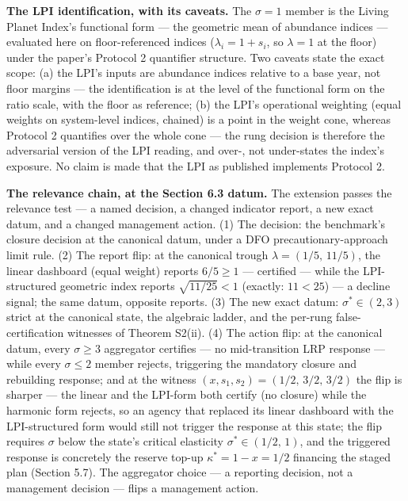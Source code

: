 \documentclass[3p,11pt]{elsarticle}
\begin{document}
\textbf{The LPI identification, with its caveats.} The \(\sigma = 1\)
member is the Living Planet Index's functional form --- the geometric mean
of abundance indices --- evaluated here on floor-referenced indices
(\(\lambda_i = 1 + s_i\), so \(\lambda = 1\) at the floor) under the
paper's Protocol 2 quantifier structure. Two caveats state the exact
scope: (a) the LPI's inputs are abundance indices relative to a base
year, not floor margins --- the identification is at the level of the
functional form on the ratio scale, with the floor as reference; (b) the
LPI's operational weighting (equal weights on system-level indices,
chained) is a point in the weight cone, whereas Protocol 2 quantifies
over the whole cone --- the rung decision is therefore the adversarial
version of the LPI reading, and over-, not under-states the index's
exposure. No claim is made that the LPI as published implements Protocol
2.

\textbf{The relevance chain, at the Section 6.3 datum.} The extension
passes the relevance test --- a named decision, a changed indicator
report, a new exact datum, and a changed management action. (1) The
decision: the benchmark's closure decision at the canonical datum, under
a DFO precautionary-approach limit rule. (2) The report flip: at
the canonical trough \(\lambda = (1/5,\, 11/5)\), the linear dashboard
(equal weight) reports \(6/5 \ge 1\) --- certified --- while the
LPI-structured geometric index reports \(\sqrt{11/25} < 1\) (exactly:
\(11 < 25\)) --- a decline signal; the same datum, opposite reports.
(3) The new exact datum: \(\sigma^* \in (2, 3)\) strict at the
canonical state, the algebraic ladder, and the per-rung
false-certification witnesses of Theorem S2(ii). (4) The action flip: at
the canonical datum, every \(\sigma \ge 3\) aggregator certifies --- no
mid-transition LRP response --- while every \(\sigma \le 2\) member
rejects, triggering the mandatory closure and rebuilding response; and at
the witness \((x, s_1, s_2) = (1/2,\, 3/2,\, 3/2)\) the flip is
sharper --- the linear and the LPI-form both certify (no closure) while
the harmonic form rejects, so an agency that replaced its linear
dashboard with the LPI-structured form would still not trigger the
response at this state; the flip requires \(\sigma\) below the state's
critical elasticity \(\sigma^* \in (1/2,\, 1)\), and the triggered
response is concretely the reserve top-up \(\kappa^* = 1 - x = 1/2\)
financing the staged plan (Section 5.7). The aggregator choice --- a
reporting decision, not a management decision --- flips a management
action.
\end{document}
